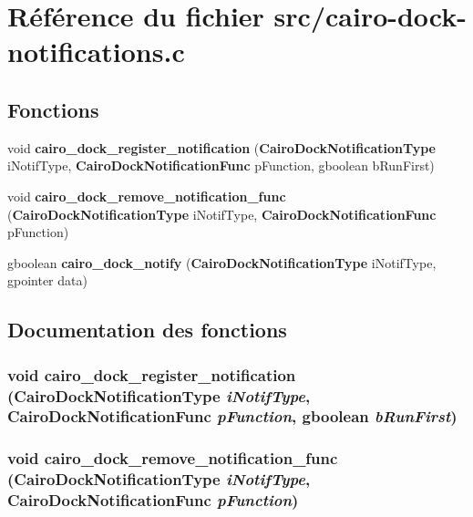 \section{R\'{e}f\'{e}rence du fichier src/cairo-dock-notifications.c}
\label{cairo-dock-notifications_8c}
\subsection*{Fonctions}
\begin{CompactItemize}
\item 
void {\bf cairo\_\-dock\_\-register\_\-notification} ({\bf Cairo\-Dock\-Notification\-Type} i\-Notif\-Type, {\bf Cairo\-Dock\-Notification\-Func} p\-Function, gboolean b\-Run\-First)
\item 
void {\bf cairo\_\-dock\_\-remove\_\-notification\_\-func} ({\bf Cairo\-Dock\-Notification\-Type} i\-Notif\-Type, {\bf Cairo\-Dock\-Notification\-Func} p\-Function)
\item 
gboolean {\bf cairo\_\-dock\_\-notify} ({\bf Cairo\-Dock\-Notification\-Type} i\-Notif\-Type, gpointer data)
\end{CompactItemize}


\subsection{Documentation des fonctions}
\subsubsection{\setlength{\rightskip}{0pt plus 5cm}void cairo\_\-dock\_\-register\_\-notification ({\bf Cairo\-Dock\-Notification\-Type} {\em i\-Notif\-Type}, {\bf Cairo\-Dock\-Notification\-Func} {\em p\-Function}, gboolean {\em b\-Run\-First})}\label{cairo-dock-notifications_8c_845e5c4be6a3a3d1be2de99f9c6a93a6}


\subsubsection{\setlength{\rightskip}{0pt plus 5cm}void cairo\_\-dock\_\-remove\_\-notification\_\-func ({\bf Cairo\-Dock\-Notification\-Type} {\em i\-Notif\-Type}, {\bf Cairo\-Dock\-Notification\-Func} {\em p\-Function})}\label{cairo-dock-notifications_8c_f91590fc1a8f0f395f4d39c8f6942dc6}


